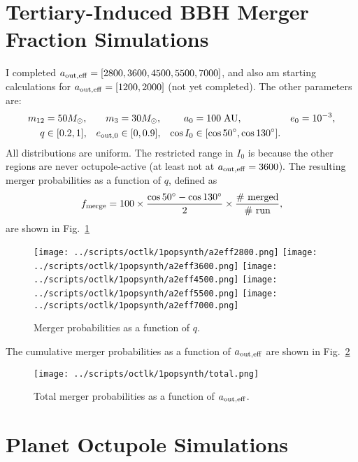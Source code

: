 \documentclass[11pt,
        usenames, %
        dvipsnames %
    ]{article}
\begin{document}
\onehalfspacing

\section{Tertiary-Induced BBH Merger Fraction Simulations}

I completed $a_{\rm out, eff} = [2800, 3600, 4500, 5500, 7000]$, and also am
starting calculations for $a_{\rm out, eff} = [1200, 2000]$ (not yet
completed). The other parameters are:
\begin{align*}[h]
    m_{12} &= 50M_{\odot}, &
    m_3 &= 30M_{\odot}, &
    a_0 &= 100\;\mathrm{AU}, &
    e_0 &= 10^{-3},\\
    q &\in [0.2, 1], &
    e_{\rm out, 0} &\in [0, 0.9], &
    \cos I_0 &\in [\cos 50^\circ, \cos 130^\circ].
\end{align*}
All distributions are uniform. The restricted range in $I_0$ is because the
other regions are never octupole-active (at least not at $a_{\rm out, eff} =
3600$). The resulting merger probabilities as a
function of $q$, defined as
\begin{equation}
    f_{\rm merge} = 100 \times \frac{\cos 50^\circ - \cos 130^\circ}{2}
        \times \frac{\textrm{\# merged}}{\textrm{\# run}},
\end{equation}
are shown in Fig.~\ref{fig:all}
\begin{figure}[h]
    \centering
    \texttt{[image: ../scripts/octlk/1popsynth/a2eff2800.png]}
    \texttt{[image: ../scripts/octlk/1popsynth/a2eff3600.png]}
    \texttt{[image: ../scripts/octlk/1popsynth/a2eff4500.png]}
    \texttt{[image: ../scripts/octlk/1popsynth/a2eff5500.png]}
    \texttt{[image: ../scripts/octlk/1popsynth/a2eff7000.png]}
    \caption{Merger probabilities as a function of $q$.}\label{fig:all}
\end{figure}

The cumulative merger probabilities as a function of $a_{\rm out, eff}$ are
shown in Fig.~\ref{fig:merge}
\begin{figure}
    \centering
    \texttt{[image: ../scripts/octlk/1popsynth/total.png]}
    \caption{Total merger probabilities as a function of $a_{\rm out,
    eff}$.}\label{fig:merge}
\end{figure}

\clearpage

\section{Planet Octupole Simulations}
\end{document}

